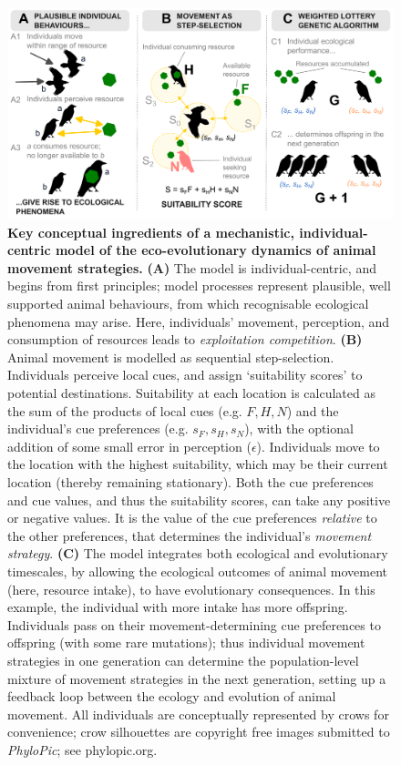 \begin{figure}
  \centering
  \includegraphics[width=0.9\linewidth]{figures/introduction/fig_concept.png}
  \caption{
      \textbf{Key conceptual ingredients of a mechanistic, individual-centric model of the eco-evolutionary dynamics of animal movement strategies.}
      \textbf{(A)} The model is individual-centric, and begins from first principles; model processes represent plausible, well supported animal behaviours, from which recognisable ecological phenomena may arise. Here, individuals' movement, perception, and consumption of resources leads to \textit{exploitation competition}.
      \textbf{(B)} Animal movement is modelled as sequential step-selection. Individuals perceive local cues, and assign `suitability scores' to potential destinations. Suitability at each location is calculated as the sum of the products of local cues (e.g. $F, H, N$) and the individual's cue preferences (e.g. $s_F, s_H, s_N$), with the optional addition of some small error in perception ($\epsilon$). Individuals move to the location with the highest suitability, which may be their current location (thereby remaining stationary). Both the cue preferences and cue values, and thus the suitability scores, can take any positive or negative values. It is the value of the cue preferences \textit{relative} to the other preferences, that determines the individual's \textit{movement strategy}.
      \textbf{(C)} The model integrates both ecological and evolutionary timescales, by allowing the ecological outcomes of animal movement (here, resource intake), to have evolutionary consequences. In this example, the individual with more intake has more offspring. Individuals pass on their movement-determining cue preferences to offspring (with some rare mutations); thus individual movement strategies in one generation can determine the population-level mixture of movement strategies in the next generation, setting up a feedback loop between the ecology and evolution of animal movement.
      All individuals are conceptually represented by crows for convenience; crow silhouettes are copyright free images submitted to \textit{PhyloPic}; see phylopic.org.
  }
  \label{fig:intro_concepts}
\end{figure}


